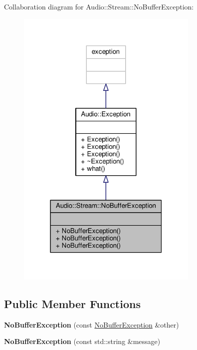 Collaboration diagram for Audio\+:\+:Stream\+:\+:No\+Buffer\+Exception\+:
\nopagebreak
\begin{figure}[H]
\begin{center}
\leavevmode
\includegraphics[width=247pt]{d3/d13/classAudio_1_1Stream_1_1NoBufferException__coll__graph}
\end{center}
\end{figure}
\subsection*{Public Member Functions}
\begin{DoxyCompactItemize}
\item 
{\bfseries No\+Buffer\+Exception} (const \hyperlink{classAudio_1_1Stream_1_1NoBufferException}{No\+Buffer\+Exception} \&other)\hypertarget{classAudio_1_1Stream_1_1NoBufferException_ac3f0cf012f907a012d94d435f8fc94d1}{}\label{classAudio_1_1Stream_1_1NoBufferException_ac3f0cf012f907a012d94d435f8fc94d1}

\item 
{\bfseries No\+Buffer\+Exception} (const std\+::string \&message)\hypertarget{classAudio_1_1Stream_1_1NoBufferException_ace20822264a14b080b6fa133b896db16}{}\label{classAudio_1_1Stream_1_1NoBufferException_ace20822264a14b080b6fa133b896db16}

\end{DoxyCompactItemize}


